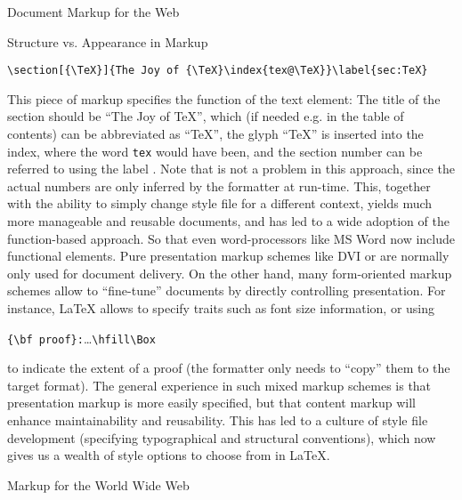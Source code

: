 \begin{tchapter}[id=markup-web]{Document Markup for the Web}
\begin{tsection}[id=markup-types]{Structure vs. Appearance in Markup}
\begin{small}
\begin{verbatim}
\section[{\TeX}]{The Joy of {\TeX}\index{tex@\TeX}}\label{sec:TeX}
\end{verbatim}
\end{small}
This piece of markup specifies the function of the text element: The title of the section
should be ``The Joy of {\TeX}'', which (if needed e.g. in the table of contents) can be
abbreviated as ``{\TeX}'', the glyph ``{\TeX}'' is inserted into the index, where the word
{\tt{tex}} would have been, and the section number can be referred to using the label
{}.  Note that {} is not a problem in this
approach, since the actual numbers are only inferred by the formatter at run-time. This,
together with the ability to simply change style file for a different context, yields much
more manageable and reusable documents, and has led to a wide adoption of the
function-based approach. So that even word-processors like MS Word now include functional
elements. Pure presentation markup schemes like {DVI} or {\postscript} are
normally only used for document delivery. On the other hand, many form-oriented markup
schemes allow to ``fine-tune'' documents by directly controlling presentation. For
instance, {\LaTeX} allows to specify traits such as font size information, or using
\begin{center}
  {\verb+{\bf proof}:+}\ldots{\verb+\hfill\Box+}
\end{center}
to indicate the extent of a proof (the formatter only needs to ``copy'' them to
the target format). The general experience in such mixed markup schemes is that
presentation markup is more easily specified, but that content markup will enhance
maintainability and reusability. This has led to a culture of style file
development (specifying typographical and structural conventions), which now gives
us a wealth of style options to choose from in {\LaTeX}.
\end{tsection}

\begin{tsection}[id=markup:www]{Markup for the World Wide Web}{}


\end{tsection}
\end{tchapter}
